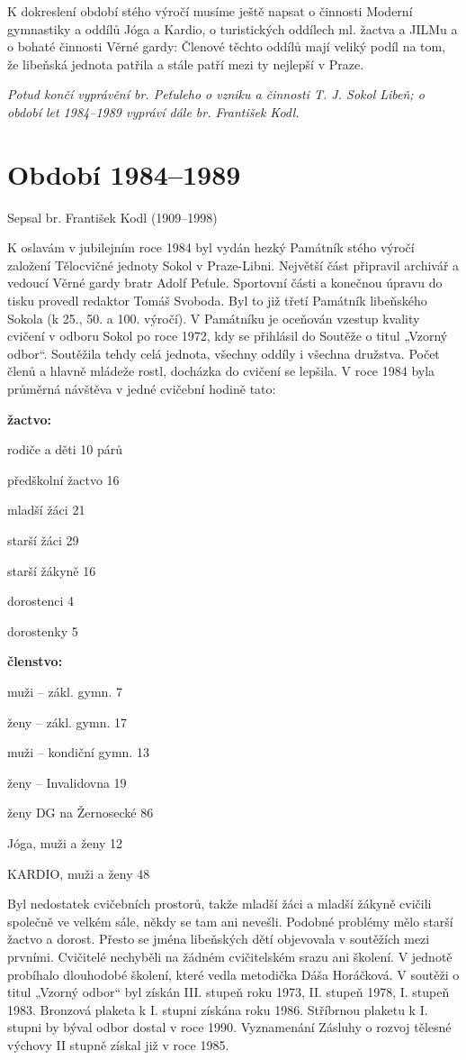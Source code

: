 K dokreslení období stého výročí musíme ještě napsat o činnosti Moderní
gymnastiky a oddílů Jóga a Kardio, o turistických oddílech ml. žactva a
JILMu a o bohaté činnosti Věrné gardy: Členové těchto oddílů mají veliký
podíl na tom, že libeňská jednota patřila a stále patří mezi ty nejlepší
v Praze.

\emph{Potud končí vyprávění br. Peťuleho o vzniku a činnosti T. J. Sokol
Libeň; o období let 1984--1989 vypráví dále br. František Kodl.}

\section{Období 1984--1989}\label{obdobuxed-19841989}

Sepsal br. František Kodl (1909--1998)

K oslavám v jubilejním roce 1984 byl vydán hezký Památník stého výročí
založení Tělocvičné jednoty Sokol v Praze-Libni. Největší část připravil
archivář a vedoucí Věrné gardy bratr Adolf Peťule. Sportovní části a
konečnou úpravu do tisku provedl redaktor Tomáš Svoboda. Byl to již
třetí Památník libeňského Sokola (k 25., 50. a 100. výročí). V Památníku
je oceňován vzestup kvality cvičení v odboru Sokol po roce 1972, kdy se
přihlásil do Soutěže o titul „Vzorný odbor``. Soutěžila tehdy celá
jednota, všechny oddíly i všechna družstva. Počet členů a hlavně mládeže
rostl, docházka do cvičení se lepšila. V roce 1984 byla průměrná
návštěva v jedné cvičební hodině tato:

\textbf{žactvo:}

rodiče a děti 10 párů

předškolní žactvo 16

mladší žáci 21

starší žáci 29

starší žákyně 16

dorostenci 4

dorostenky 5

\textbf{členstvo:}

muži -- zákl. gymn. 7

ženy -- zákl. gymn. 17

muži -- kondiční gymn. 13

ženy -- Invalidovna 19

ženy DG na Žernosecké 86

Jóga, muži a ženy 12

KARDIO, muži a ženy 48

Byl nedostatek cvičebních prostorů, takže mladší žáci a mladší žákyně
cvičili společně ve velkém sále, někdy se tam ani nevešli. Podobné
problémy mělo starší žactvo a dorost. Přesto se jména libeňských dětí
objevovala v soutěžích mezi prvními. Cvičitelé nechyběli na žádném
cvičitelském srazu ani školení. V jednotě probíhalo dlouhodobé školení,
které vedla metodička Dáša Horáčková. V soutěži o titul „Vzorný odbor``
byl získán III. stupeň roku 1973, II. stupeň 1978, I. stupeň 1983.
Bronzová plaketa k I. stupni získána roku 1986. Stříbrnou plaketu k I.
stupni by býval odbor dostal v roce 1990. Vyznamenání Zásluhy o rozvoj
tělesné výchovy II stupně získal již v roce 1985.

